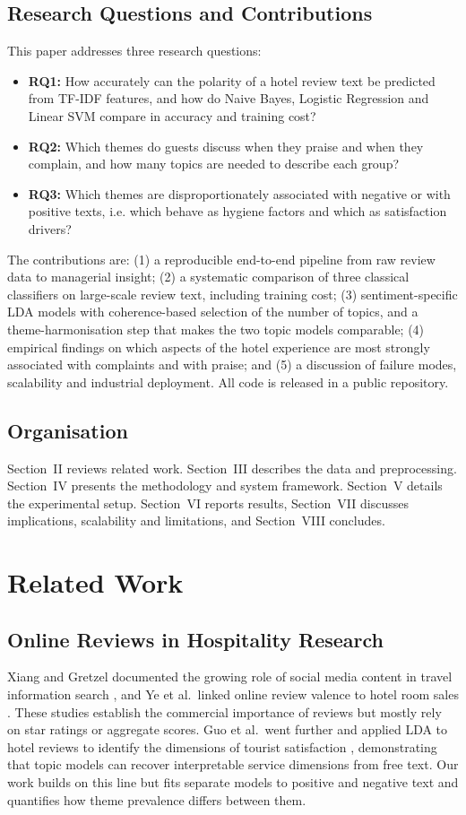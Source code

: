 \documentclass[11pt,journal,draftclsnofoot,onecolumn]{IEEEtran}
\begin{document}
\subsection{Research Questions and Contributions}
This paper addresses three research questions:
\begin{itemize}
\item \textbf{RQ1:} How accurately can the polarity of a hotel review text be predicted from TF-IDF features, and how do Naive Bayes, Logistic Regression and Linear SVM compare in accuracy and training cost?
\item \textbf{RQ2:} Which themes do guests discuss when they praise and when they complain, and how many topics are needed to describe each group?
\item \textbf{RQ3:} Which themes are disproportionately associated with negative or with positive texts, i.e. which behave as hygiene factors and which as satisfaction drivers?
\end{itemize}
The contributions are: (1) a reproducible end-to-end pipeline from raw review data to managerial insight; (2) a systematic comparison of three classical classifiers on large-scale review text, including training cost; (3) sentiment-specific LDA models with coherence-based selection of the number of topics, and a theme-harmonisation step that makes the two topic models comparable; (4) empirical findings on which aspects of the hotel experience are most strongly associated with complaints and with praise; and (5) a discussion of failure modes, scalability and industrial deployment. All code is released in a public repository.

\subsection{Organisation}
Section~II reviews related work. Section~III describes the data and preprocessing. Section~IV presents the methodology and system framework. Section~V details the experimental setup. Section~VI reports results, Section~VII discusses implications, scalability and limitations, and Section~VIII concludes.

\section{Related Work}
\subsection{Online Reviews in Hospitality Research}
Xiang and Gretzel documented the growing role of social media content in travel information search \cite{xiang2010}, and Ye et al.\ linked online review valence to hotel room sales \cite{ye2009}. These studies establish the commercial importance of reviews but mostly rely on star ratings or aggregate scores. Guo et al.\ went further and applied LDA to hotel reviews to identify the dimensions of tourist satisfaction \cite{guo2017}, demonstrating that topic models can recover interpretable service dimensions from free text. Our work builds on this line but fits separate models to positive and negative text and quantifies how theme prevalence differs between them.
\end{document}
